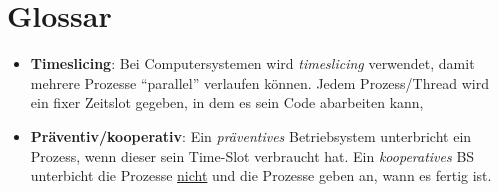 \documentclass[
  9pt,
  a4paperpaper,
  DIV=11]{scrartcl}
\numberwithin{equation}{section}
\begin{document}
\hypertarget{glossar}{%
\section{Glossar}\label{glossar}}

\begin{itemize}
\item
  \textbf{Timeslicing}: Bei Computersystemen wird \emph{timeslicing}
  verwendet, damit mehrere Prozesse ``parallel'' verlaufen können. Jedem
  Prozess/Thread wird ein fixer Zeitslot gegeben, in dem es sein Code
  abarbeiten kann,
\item
  \textbf{Präventiv/kooperativ}: Ein \emph{präventives} Betriebsystem
  unterbricht ein Prozess, wenn dieser sein Time-Slot verbraucht hat.
  Ein \emph{kooperatives} BS unterbicht die Prozesse \uline{nicht} und
  die Prozesse geben an, wann es fertig ist.
\end{itemize}
\end{document}
